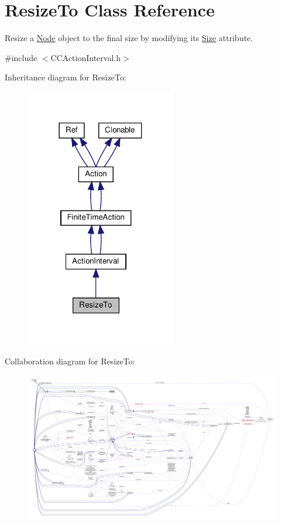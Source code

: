 \hypertarget{classResizeTo}{}\section{Resize\+To Class Reference}
\label{classResizeTo}


Resize a \hyperlink{classNode}{Node} object to the final size by modifying it\textquotesingle{}s \hyperlink{classSize}{Size} attribute.  




{\ttfamily \#include $<$C\+C\+Action\+Interval.\+h$>$}



Inheritance diagram for Resize\+To\+:
\nopagebreak
\begin{figure}[H]
\begin{center}
\leavevmode
\includegraphics[width=186pt]{classResizeTo__inherit__graph}
\end{center}
\end{figure}


Collaboration diagram for Resize\+To\+:
\nopagebreak
\begin{figure}[H]
\begin{center}
\leavevmode
\includegraphics[width=350pt]{classResizeTo__coll__graph}
\end{center}
\end{figure}
